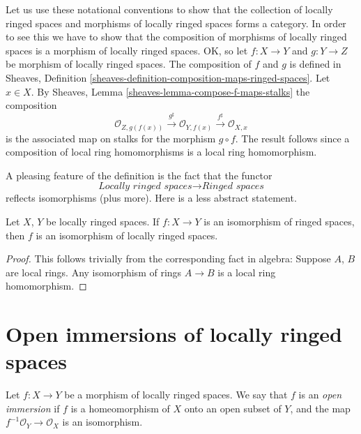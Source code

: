 \medskip\noindent
Let us use these notational conventions to show that the
collection of locally ringed spaces and morphisms of locally
ringed spaces forms a category. In order to see this we have
to show that the composition of morphisms of locally ringed
spaces is a morphism of locally ringed spaces. OK, so let
$f : X \to Y$ and $g : Y \to Z$ be morphism of locally
ringed spaces. The composition of $f$ and $g$ is defined in
Sheaves, Definition \ref{sheaves-definition-composition-maps-ringed-spaces}.
Let $x \in X$. By
Sheaves, Lemma \ref{sheaves-lemma-compose-f-maps-stalks}
the composition
$$
\mathcal{O}_{Z, g(f(x))}
\xrightarrow{g^\sharp}
\mathcal{O}_{Y, f(x)}
\xrightarrow{f^\sharp}
\mathcal{O}_{X, x}
$$
is the associated map on stalks for the morphism $g \circ f$.
The result follows since a composition of local ring
homomorphisms is a local ring homomorphism.

\medskip\noindent
A pleasing feature of the definition is the fact that the functor
$$
\textit{Locally ringed spaces}
\longrightarrow
\textit{Ringed spaces}
$$
reflects isomorphisms (plus more).
Here is a less abstract statement.

\begin{lemma}
\label{lemma-isomorphism-locally-ringed}
Let $X$, $Y$ be locally ringed spaces.
If $f : X \to Y$ is an isomorphism of
ringed spaces, then $f$ is an isomorphism
of locally ringed spaces.
\end{lemma}

\begin{proof}
This follows trivially from the corresponding fact in algebra:
Suppose $A$, $B$ are local rings. Any isomorphism of rings
$A \to B$ is a local ring homomorphism.
\end{proof}













\section{Open immersions of locally ringed spaces}
\label{section-open-immersion}

\begin{definition}
\label{definition-immersion-locally-ringed-spaces}
Let $f : X \to Y$ be a morphism of locally ringed spaces.
We say that $f$ is an {\it open immersion} if
$f$ is a homeomorphism of $X$ onto an open subset
of $Y$, and the map $f^{-1}\mathcal{O}_Y \to \mathcal{O}_X$
is an isomorphism.
\end{definition}

